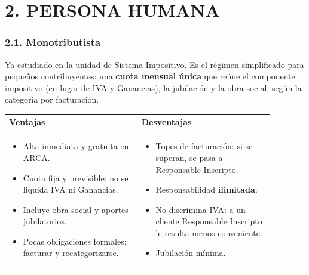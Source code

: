 \section*{2. PERSONA HUMANA}

\subsubsection*{2.1. Monotributista}
Ya estudiado en la unidad de Sistema Impositivo. Es el régimen simplificado para pequeños
contribuyentes: una \textbf{cuota mensual única} que reúne el componente impositivo (en lugar de
IVA y Ganancias), la jubilación y la obra social, según la categoría por facturación.

\begin{center}
\small
\begin{tabular}{|p{0.44\linewidth}|p{0.44\linewidth}|}
\hline
\textbf{Ventajas} & \textbf{Desventajas} \\ \hline
\begin{itemize}[leftmargin=*,nosep]
  \item Alta inmediata y gratuita en ARCA.
  \item Cuota fija y previsible; no se liquida IVA ni Ganancias.
  \item Incluye obra social y aportes jubilatorios.
  \item Pocas obligaciones formales: facturar y recategorizarse.
\end{itemize}
&
\begin{itemize}[leftmargin=*,nosep]
  \item Topes de facturación: si se superan, se pasa a Responsable Inscripto.
  \item Responsabilidad \textbf{ilimitada}.
  \item No discrimina IVA: a un cliente Responsable Inscripto le resulta menos conveniente.
  \item Jubilación mínima.
\end{itemize}
\\ \hline
\end{tabular}
\end{center}

